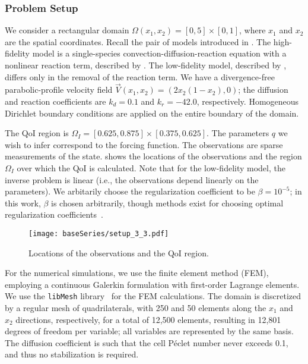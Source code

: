 \subsubsection{Problem Setup} \label{sec:cdvcdrSetup}
%
We consider a rectangular domain $\Omega(x_1,x_2)=[0,5]\times[0,1]$, where $x_1$ and $x_2$ are the spatial coordinates. Recall the pair of models introduced in . The high-fidelity model is a single-species convection-diffusion-reaction equation with a nonlinear reaction term, described by . The low-fidelity model, described by , differs only in the removal of the reaction term. We have a divergence-free parabolic-profile velocity field $\vec{V}(x_1,x_2) = (2x_2(1-x_2),0)$; the diffusion and reaction coefficients are $k_d = 0.1$ and $k_r = -42.0$, respectively. Homogeneous Dirichlet boundary conditions are applied on the entire boundary of the domain. 

The QoI region is $\Omega_I=[0.625,0.875]\times[0.375,0.625]$. The parameters $q$ we wish to infer correspond to the forcing function. The observations are sparse measurements of the state.
 shows the locations of the observations and the region $\Omega_I$ over which the QoI is calculated. Note that for the low-fidelity model, the inverse problem is linear (i.e., the observations depend linearly on the parameters). We arbitarily choose the regularization coefficient to be $\beta=10^{-5}$; in this work, $\beta$ is chosen arbitrarily, though methods exist for choosing optimal regularization coefficients~\cite{BelgeKilmerMiller02,Calvetal00}.
%
\begin{figure}[htbp]
\centering
\texttt{[image: baseSeries/setup\_3\_3.pdf]}
\caption{Locations of the observations and the QoI region.}
\label{fig:baseSetup}
\end{figure}
%

For the numerical simulations, we use the finite element method (FEM), employing a continuous Galerkin formulation with first-order Lagrange elements. We use the \texttt{libMesh} library~\cite{libMeshPaper} for the FEM calculations.
The domain is discretized by a regular mesh of quadrilaterals, with 250 and 50 elements along the $x_1$ and $x_2$ directions, respectively, for a total of 12,500 elements, resulting in 12,801 degrees of freedom per variable; all variables are represented by the same basis. The diffusion coefficient is such that the cell P\'{e}clet number never exceeds 0.1, and thus no stabilization is required.

